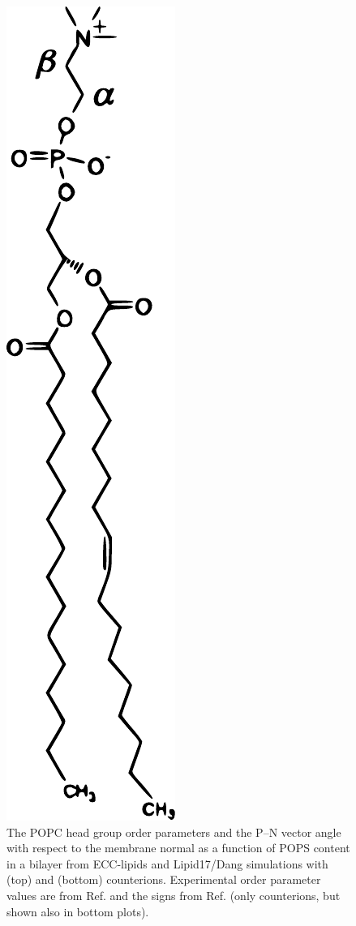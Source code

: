 \documentclass[journal=jpcbfk,manuscript=article]{achemso}
\newlength{\figheightsmall}
\newlength{\figheight}
\begin{document}
\begin{figure}[!tbp]
  \includegraphics[height=\figheightsmall]{../img/POPCstructure.pdf} 
  \caption{\label{fig:delta_ordPar_NaCl_PC-PS_mix_PC} 
    The POPC head group order parameters and the P--N vector angle
    with respect to the membrane normal as a function of POPS content in a bilayer
    from ECC-lipids and Lipid17/Dang simulations with  (top) and  (bottom) counterions.
    Experimental order parameter values are from Ref. 
    and the signs from Ref.  (only  counterions, but shown also in bottom plots).
  }
\end{figure} 
\end{document}
